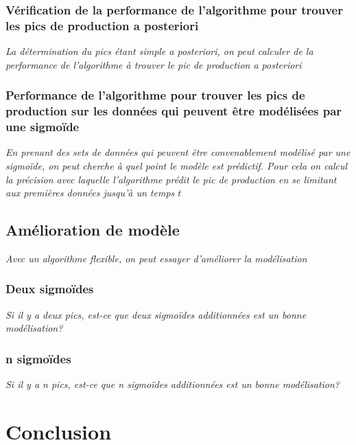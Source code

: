 \documentclass{article}
\begin{document}
\subsubsection{Vérification de la performance de l'algorithme pour trouver les pics de production a posteriori}
\textit{La détermination du pics étant simple a posteriori, on peut calculer de la performance de l'algorithme à trouver le pic de production a posteriori}

\subsubsection{Performance de l'algorithme pour trouver les pics de production sur les données qui peuvent être modélisées par une sigmoïde}
\textit{En prenant des sets de données qui peuvent être convenablement modélisé par une sigmoïde, on peut cherche à quel point le modèle est prédictif. Pour cela on calcul la précision avec laquelle l'algorithme prédit le pic de production en se limitant aux premières données jusqu'à un temps $t$}

\subsection{Amélioration de modèle}
\textit{Avec un algorithme flexible, on peut essayer d'améliorer la modélisation}

\subsubsection{Deux sigmoïdes}
\textit{Si il y a deux pics, est-ce que deux sigmoïdes additionnées est un bonne modélisation?}

\subsubsection{n sigmoïdes}
\textit{Si il y a n pics, est-ce que n sigmoïdes additionnées est un bonne modélisation?}

\section{Conclusion}
\end{document}
